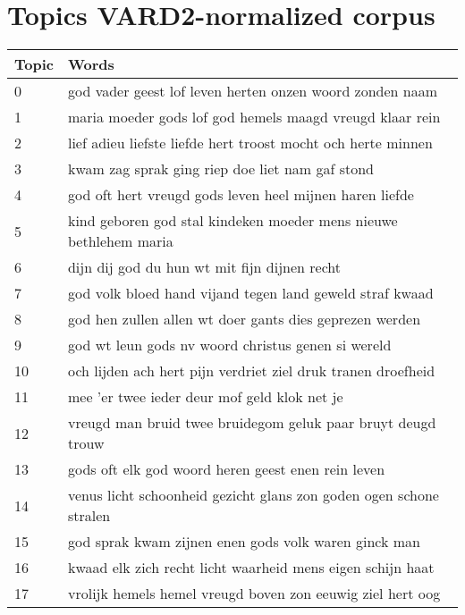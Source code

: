 \chapter{Topics VARD2-normalized corpus}

\begin{longtable}{p{} | p{}}
	\toprule
	Topic & Words \\       
	\midrule                                                             
	0     & god vader geest lof leven herten onzen woord zonden naam           \\
	1     & maria moeder gods lof god hemels maagd vreugd klaar rein           \\
	2     & lief adieu liefste liefde hert troost mocht och herte minnen       \\
	3     & kwam zag sprak ging riep doe liet nam gaf stond                    \\
	4     & god oft hert vreugd gods leven heel mijnen haren liefde            \\
	5     & kind geboren god stal kindeken moeder mens nieuwe bethlehem maria  \\
	6     & dijn dij god du hun wt mit fijn dijnen recht                       \\
	7     & god volk bloed hand vijand tegen land geweld straf kwaad           \\
	8     & god hen zullen allen wt doer gants dies geprezen werden            \\
	9     & god wt leun gods nv woord christus genen si wereld                 \\
	10    & och lijden ach hert pijn verdriet ziel druk tranen droefheid       \\
	11    & mee 'er twee ieder deur mof geld klok net je                       \\
	12    & vreugd man bruid twee bruidegom geluk paar bruyt deugd trouw       \\
	13    & gods oft elk god woord heren geest enen rein leven                 \\
	14    & venus licht schoonheid gezicht glans zon goden ogen schone stralen \\
	15    & god sprak kwam zijnen enen gods volk waren ginck man               \\
	16    & kwaad elk zich recht licht waarheid mens eigen schijn haat         \\
	17    & vrolijk hemels hemel vreugd boven zon eeuwig ziel hert oog         \\

\end{longtable}
